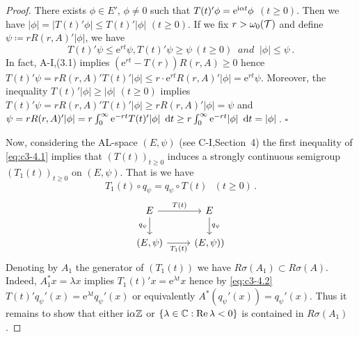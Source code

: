 \begin{proof}
	There exists $\phi \in E'$, $\phi \neq 0$ such that $T(t)'\phi = \mathrm{e}^{\mathrm{i}\alpha t}\phi$ $(t \geq 0)$. 
	Then we have $|\phi| = |T(t)'\phi| \leq T(t)'|\phi|$ $(t \geq 0)$.
	If we fix $r > \omega_0(\mathcal{T})$ and define $\psi \coloneqq  rR(r,A)'|\phi|$, we have
	\begin{equation}\label{eq:c3-4.1}
		T(t)'\psi \leq \mathrm{e}^{rt}\psi, T(t)'\psi \geq \psi \ (t \geq 0) \ \textit{ and } \ |\phi| \leq \psi\,.
	\end{equation}
%
	In fact, A-I,(3.1) implies $(\mathrm{e}^{rt} - T(r))R(r,A) \geq 0$ hence $T(t)'\psi = rR(r,A)'T(t)'|\phi| \leq r\cdot \mathrm{e}^{rt}R(r,A)'|\phi| = \mathrm{e}^{rt}\psi$.
	Moreover, the inequality $T(t)'|\phi| \geq |\phi|$ $(t \geq 0)$ implies $T(t)'\psi = rR(r,A)'T(t)'|\phi| \geq rR(r,A)'|\phi| = \psi$ and $\psi = rR(r,A)'|\phi| = r \int_{0}^{\infty} \mathrm{e}^{-rt}T(t)'|\phi|~\mathop{}\!\mathrm{d}{t}  \geq r\int_{0}^{\infty} \mathrm{e}^{-rt}|\phi|~\mathop{}\!\mathrm{d}{t}  = |\phi|$\,.
	$\square$
	
	Now, considering the AL-space $(E,\psi)$ (see C-I,Section~4) the first inequality of \eqref{eq:c3-4.1} implies that $(T(t))_{t \geq 0}$ induces a strongly continuous semigroup $(T_{1}(t))_{t \geq 0}$ on $(E,\psi)$.
	That is we have
	\begin{equation}\label{eq:c3-4.2}
		\textit{$T_{1}(t)\circ q_{\psi} = q_{\psi}\circ T(t)$ $(t \geq 0)$}\,.
	\end{equation}
	\[
	\begin{tikzcd}
		E \arrow[r, "T(t)"] \arrow[d, "q_\psi"'] & E \arrow[d, "q_\psi"] \\
		(E,\psi) \arrow[r, "T_1(t)"'] & (E,\psi))
	\end{tikzcd}
	\]
	Denoting by $A_{1}$ the generator of $(T_{1}(t))$ we have $R\sigma(A_{1}) \subset R\sigma(A)$.
	Indeed, $A_{1}^*x = \lambda x$ implies $T_{1}(t)'x = \mathrm{e}^{\lambda t}x$ hence by \eqref{eq:c3-4.2} $T(t)'q_{\psi}'(x) = \mathrm{e}^{\lambda t}q_{\psi}'(x)$ or equivalently $A^*(q_{\psi}'(x)) = q_{\psi}'(x)$. 
	Thus it remains to show that either $\mathrm{i}\alpha\mathbb{Z}$ or $\{\lambda \in \mathbb{C}  : \mathop{}\!\mathrm{Re}\,\lambda < 0 \}$ is contained in $R\sigma(A_{1})$. 
	

\end{proof}
